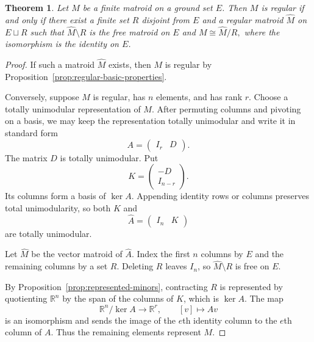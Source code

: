 \documentclass[11pt]{article}
\numberwithin{equation}{section}
\newtheorem{theorem}[definition]{Theorem}
\theoremstyle{remark}
\begin{document}
\begin{theorem}
\label{thm:regular-quotient-form}
Let $M$ be a finite matroid on a ground set $E$. Then $M$ is regular if and only if there exist a finite set $R$ disjoint from $E$ and a regular matroid $\widehat M$ on $E\sqcup R$ such that
\(
    \widehat M\setminus R
\)
is the free matroid on $E$ and
\(
    M\cong \widehat M/R,
\)
where the isomorphism is the identity on $E$.
\end{theorem}

\begin{proof}
If such a matroid $\widehat M$ exists, then $M$ is regular by
Proposition~\ref{prop:regular-basic-properties}.

Conversely, suppose $M$ is regular, has $n$ elements, and has rank $r$.
Choose a totally unimodular representation of $M$. After permuting columns
and pivoting on a basis, we may keep the representation totally unimodular
and write it in standard form
\begin{equation}
    A=
    \begin{pmatrix}
        I_r & D
    \end{pmatrix}.
\end{equation}
The matrix $D$ is totally unimodular. Put
\begin{equation}
    K=
    \begin{pmatrix}
        -D\\
        I_{n-r}
    \end{pmatrix}.
\end{equation}
Its columns form a basis of $\ker A$. Appending identity rows or columns
preserves total unimodularity, so both $K$ and
\begin{equation}
    \widehat A=
    \begin{pmatrix}
        I_n & K
    \end{pmatrix}
\end{equation}
are totally unimodular.

Let $\widehat M$ be the vector matroid of $\widehat A$. Index the first $n$
columns by $E$ and the remaining columns by a set $R$. Deleting $R$ leaves
$I_n$, so $\widehat M\setminus R$ is free on $E$.

By Proposition~\ref{prop:represented-minors}, contracting $R$ is represented
by quotienting $\mathbb R^n$ by the span of the columns of $K$, which is
$\ker A$. The map
\begin{equation}
    \mathbb R^n/\ker A\longrightarrow\mathbb R^r,
    \qquad
    [v]\longmapsto Av
\end{equation}
is an isomorphism and sends the image of the $e$th identity column to the
$e$th column of $A$. Thus the remaining elements represent $M$.
\end{proof}
\end{document}
